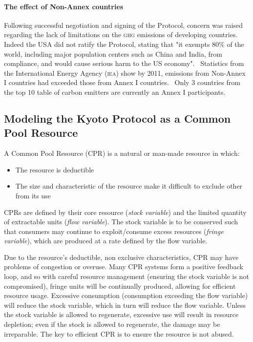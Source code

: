 \documentclass[]{article} %
\begin{document}
\paragraph{The effect of Non-Annex countries}

Following successful negotiation and signing of the Protocol, concern was raised regarding the lack of limitations on the \textsc{ghg} emissions of developing countries. Indeed the \textsc{USA} did not ratify the Protocol, stating that "it exempts 80\% of the world, including major population centers such as China and India, from compliance, and would cause serious harm to the US economy".~\cite{Hague-to-Marrakesh} Statistics from the International Energy Agency (\textsc{iea}) show by 2011, emissions from Non-Annex I countries had exceeded those from Annex I countries.~\cite{IEA-highlights} Only 3 countries from the top 10 table of carbon emitters are currently an Annex I participants.

\subsection{Modeling the Kyoto Protocol as a Common Pool Resource}

A Common Pool Resource (CPR) is a natural or man-made resource in which:~\cite{Ostrom-90}

\begin{itemize}
	\item The resource is deductible
	\item The size and characteristic of the resource make it difficult to exclude other from its use
\end{itemize}

CPRs are defined by their core resource (\emph{stock variable}) and the limited quantity of extractable units (\emph{flow variable}). The stock variable is to be conserved such that consumers may continue to exploit/consume excess resources (\emph{fringe variable}), which are produced at a rate defined by the flow variable.

Due to the resource’s deductible, non exclusive characteristics, CPR may have problems of congestion or overuse. Many CPR systems form a positive feedback loop, and so with careful resource management (ensuring the stock variable is not compromised), fringe units will be continually produced, allowing for efficient resource usage. Excessive consumption (consumption exceeding the flow variable) will reduce the stock variable, which in turn will reduce the flow variable. Unless the stock variable is allowed to regenerate, excessive use will result in resource depletion; even if the stock is allowed to regenerate, the damage may be irreparable. The key to efficient CPR is to ensure the resource is not abused.
\end{document}
